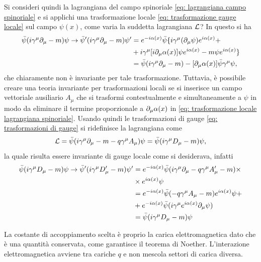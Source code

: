 Si consideri quindi la lagrangiana del campo spinoriale \eqref{eq: lagrangiana campo spinoriale} e si applichi una trasformazione locale \eqref{eq: trasformazione gauge locale} sul campo $\psi(x)$, come varia la suddetta lagrangiana $\mathcal{L}$? In questo si ha
\begin{equation}
\label{eq: trasformazione locale lagrangiana spinoriale}
    \begin{split}
        \bar{\psi}(i\gamma^\mu\partial_\mu - m)\psi \to \bar{\psi}'(i\gamma^\mu\partial_\mu - m)\psi' &= e^{-i\alpha(x)}\bar{\psi}\{i\gamma^\mu(\partial_\mu\psi)e^{i\alpha(x)} + \\
        &+ i\gamma^\mu[i\partial_\mu\alpha(x)]\psi e^{i\alpha(x)} - m\psi e^{i\alpha(x)}\} \\
        &= \bar{\psi}(i\gamma^\mu\partial_\mu - m) - [\partial_\mu\alpha(x)]\bar{\psi}\gamma^\mu\psi,
    \end{split}
\end{equation}
che chiaramente non è invariante per tale trasformazione. Tuttavia, è possibile creare una teoria invariante per trasformazioni locali se si inserisce un campo vettoriale ausiliario $A_\mu$ che si trasformi contestualmente e simultaneamente a $\psi$ in modo da eliminare il termine proporzionale a $\partial_\mu\alpha(x)$ in \eqref{eq: trasformazione locale lagrangiana spinoriale}. Usando quindi le trasformazioni di gauge \eqref{eq: trasformazioni di gauge} si ridefinisce la lagrangiana come 
\begin{equation}
    \mathcal{L} = \bar{\psi}(i\gamma^\mu\partial_\mu - m - q\gamma^\mu A_\mu)\psi = \bar{\psi}(i\gamma^\mu D_\mu - m)\psi,
\end{equation}
la quale risulta essere invariante di gauge locale come si desiderava, infatti
\begin{equation}
    \begin{split}
        \bar{\psi}(i\gamma^\mu D_\mu - m)\psi \to \bar{\psi}'(i\gamma^\mu D'_\mu - m)\psi' &= e^{-i\alpha(x)}\bar{\psi}(i\gamma^\mu\partial_\mu - q\gamma^\mu A'_\mu - m)\times \\
        &\times e^{i\alpha(x)}\psi \\
        &= e^{-i\alpha(x)}\bar{\psi}(- q\gamma^\mu A_\mu- m)e^{i\alpha(x)}\psi + \\
        &+ e^{-i\alpha(x)}\bar{\psi}(i\gamma^\mu e^{i\alpha(x)}\partial_\mu\psi) \\
        &= \bar{\psi}(i\gamma^\mu D_\mu - m)\psi
    \end{split}
\end{equation}
\begin{obs}
    La costante di accoppiamento scelta è proprio la carica elettromagnetica dato che è una quantità conservata, come garantisce il teorema di Noether. L'interazione elettromagnetica avviene tra cariche $q$ e non mescola settori di carica diversa.
\end{obs}
